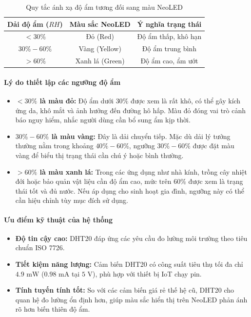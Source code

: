\begin{table}[h]
    \centering
    \begin{tabular}{|c|c|c|}
        \hline
        \textbf{Dải độ ẩm ($RH$)} & \textbf{Màu sắc NeoLED} & \textbf{Ý nghĩa trạng thái} \\
        \hline
        $< 30\%$ & Đỏ (Red) & Độ ẩm thấp, khô hạn \\
        \hline
        $30\% - 60\%$ & Vàng (Yellow) & Độ ẩm trung bình \\
        \hline
        $> 60\%$ & Xanh lá (Green) & Độ ẩm cao, ẩm ướt \\
        \hline
    \end{tabular}
    \caption{Quy tắc ánh xạ độ ẩm tương đối sang màu NeoLED}
    \label{tab:rh_to_neoled_mapping}
\end{table}

\paragraph{Lý do thiết lập các ngưỡng độ ẩm}

\begin{itemize}
    \item \textbf{$< 30\%$ là màu đỏ:} Độ ẩm dưới $30\%$ được xem là rất khô, có thể gây kích ứng da, khô mắt và ảnh hưởng đến đường hô hấp. Màu đỏ đóng vai trò cảnh báo nguy hiểm, nhắc người dùng cần bổ sung ẩm kịp thời.
    \item \textbf{$30\% - 60\%$ là màu vàng:} Đây là dải chuyển tiếp. Mặc dù dải lý tưởng thường nằm trong khoảng $40\% - 60\%$, ngưỡng $30\% - 60\%$ được đặt màu vàng để biểu thị trạng thái cần chú ý hoặc bình thường.
    \item \textbf{$> 60\%$ là màu xanh lá:} Trong các ứng dụng như nhà kính, trồng cây nhiệt đới hoặc bảo quản vật liệu cần độ ẩm cao, mức trên $60\%$ được xem là trạng thái tốt và đủ nước. Nếu áp dụng cho sinh hoạt gia đình, ngưỡng này có thể cần hiệu chỉnh tùy mục đích sử dụng.
\end{itemize}

\paragraph{Ưu điểm kỹ thuật của hệ thống}

\begin{itemize}
    \item \textbf{Độ tin cậy cao:} DHT20 đáp ứng các yêu cầu đo lường môi trường theo tiêu chuẩn ISO 7726.
    \item \textbf{Tiết kiệm năng lượng:} Cảm biến DHT20 có công suất tiêu thụ tối đa chỉ $4.9\text{ mW}$ ($0.98\text{ mA}$ tại $5\text{ V}$), phù hợp với thiết bị IoT chạy pin.
    \item \textbf{Tính tuyến tính tốt:} So với các cảm biến giá rẻ thế hệ cũ, DHT20 cho quan hệ đo lường ổn định hơn, giúp màu sắc hiển thị trên NeoLED phản ánh rõ hơn biến thiên độ ẩm.
\end{itemize}

